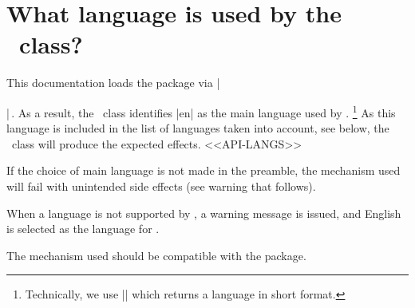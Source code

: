 \documentclass[12pt, a4paper]{tutodoc}
\begin{document}
\section{What language is used by the \thisproj\ class?}

This documentation loads the  package via \tdocinlatex|\usepackage[english]{babel}|\,.
As a result, the \thisproj\ class identifies \tdocinlatex|en| as the main language used by .%
\footnote{
	Technically, we use \tdocinlatex|| which returns a language in short format.
}
As this language is included in the list of languages taken into account, see below, the \thisproj\ class will produce the expected effects.
<<API-LANGS>>


\begin{tdoccaut}
	If the choice of main language is not made in the preamble, the mechanism used will fail with unintended side effects (see warning that follows).
\end{tdoccaut}


\begin{tdocwarn}
    When a language is not supported by \thisproj, a warning message is issued, and English is selected as the language for \thisproj.
\end{tdocwarn}


\begin{tdocnote}
    The mechanism used should be compatible with the  package.
\end{tdocnote}
\end{document}
